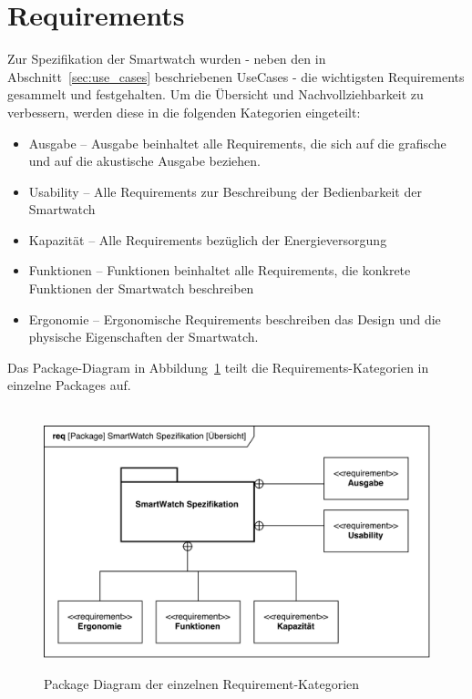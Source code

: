 \section{Requirements}
Zur Spezifikation der Smartwatch wurden - neben den in Abschnitt~\ref{sec:use_cases} beschriebenen UseCases - die wichtigsten Requirements gesammelt und festgehalten. Um die Übersicht und Nachvollziehbarkeit zu verbessern, werden diese in die folgenden Kategorien eingeteilt:

\begin{itemize}
	\item Ausgabe -- Ausgabe beinhaltet alle Requirements, die sich auf die grafische und auf die akustische Ausgabe beziehen.
	\item Usability -- Alle Requirements zur Beschreibung der Bedienbarkeit der Smartwatch
	\item Kapazität -- Alle Requirements bezüglich der Energieversorgung
	\item Funktionen -- Funktionen beinhaltet alle Requirements, die konkrete Funktionen der Smartwatch beschreiben
	\item Ergonomie -- Ergonomische Requirements beschreiben das Design und die physische Eigenschaften der Smartwatch.
\end{itemize}

Das Package-Diagram in Abbildung~\ref{fig:package_diagram_requirements} teilt die Requirements-Kategorien in einzelne Packages auf.

\begin{figure}[H]
\centering\
\includegraphics[width=14cm]{img/package_diagram_smartWatch_requirements}
\caption[Requirements: Package Diagram]{Package Diagram der einzelnen Requirement-Kategorien}
\label{fig:package_diagram_requirements}
\end{figure}

